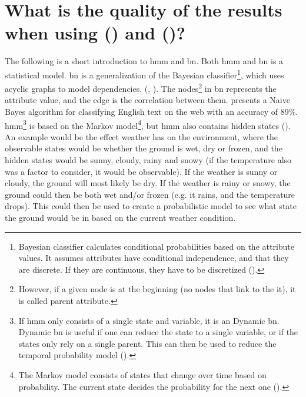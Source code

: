 \section{What is the quality of the results when using  () and  ()?}
\label{chapter3:quality_results_hmm_bn}
The following is a short introduction to \gls{hmm} and \gls{bn}. Both \gls{hmm} and \gls{bn} is a statistical model. \gls{bn} is a generalization of the Bayesian 
classifier\footnote{Bayesian classifier calculates conditional probabilities based on the attribute values. It assumes attributes have conditional independence, and 
	that they are discrete. If they are continuous, they have to be discretized (\citet[p.~7]{Kononenko2007}).}, which uses acyclic graphs to model dependencies. 
 (\citet[p.~249-256]{Kononenko2007}, \citet{Ghahramani2001}). The nodes\footnote{However, if a given node is at the beginning (no nodes that link to the it), 
	it is called parent attribute.} in \gls{bn} represents the attribute value, and the edge is the correlation between them. 
\citet[p.~180]{Mitchell1997} presents a Naive Bayes algorithm for classifying English text on the web with an accuracy of 89\%.
\vspace{0.5em}\newline
\gls{hmm}\footnote{If \gls{hmm} only consists of a single state and variable, it is an Dynamic \gls{bn}. Dynamic \gls{bn} is useful if one can reduce the state 
	to a single variable, or if the states only rely on a single parent. This can then be used to reduce the temporal probability model (\citet[p.~600-601]{Russell2013}). } 
is based on the Markov model\footnote{The Markov model consists of states that change over time based on probability. The current state decides the probability for the next 
	one (\cite[p.~3]{Moore}).}, but \gls{hmm} also contains hidden states (\citet{Ghahramani2001, Russell2013}). An example would be the effect weather has on the environment, 
where the observable states would be whether the ground is wet, dry or frozen, and the hidden states would be sunny, cloudy, rainy and snowy (if the temperature also was a 
factor to consider, it would be observable). If the weather is sunny or cloudy, the ground will most likely be dry. If the weather is rainy or snowy, the ground could then 
be both wet and/or frozen (e.g. it rains, and the temperature drops). This could then be used to create a probabilistic model to see what state the ground would be in based 
on the current weather condition.
